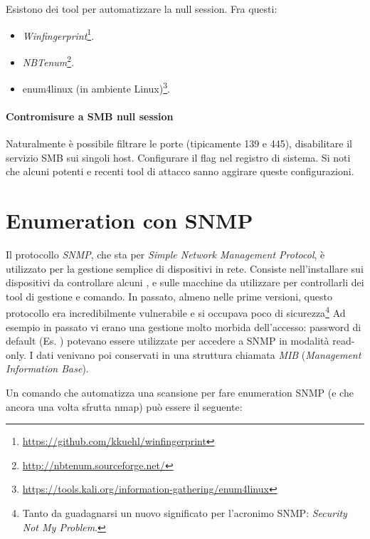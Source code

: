 \documentclass[14pt]{extreport}
\begin{document}
Esistono dei tool per automatizzare la null session. Fra questi:

\begin{itemize}
    \item \textit{Winfingerprint}\footnote{\url{https://github.com/kkuehl/winfingerprint}}.
    
    
    \item \textit{NBTenum}\footnote{\url{http://nbtenum.sourceforge.net/}}.
    
    
    \item enum4linux (in ambiente Linux)\footnote{\url{https://tools.kali.org/information-gathering/enum4linux}}.
\end{itemize}



\paragraph{Contromisure a SMB null session}

Naturalmente è possibile filtrare le porte (tipicamente 139 e 445), disabilitare il servizio SMB sui singoli host. Configurare il flag  nel registro di sistema. Si noti che alcuni potenti e recenti tool di attacco sanno aggirare queste configurazioni.





\section{Enumeration con SNMP}

Il protocollo \textit{SNMP}, che sta per \textit{Simple Network Management Protocol}, è utilizzato per la gestione semplice di dispositivi in rete. Consiste nell'installare sui dispositivi da controllare alcuni , e sulle macchine da utilizzare per controllarli dei tool di gestione e comando.\newline
In passato, almeno nelle prime versioni, questo protocollo era incredibilmente vulnerabile e si occupava poco di sicurezza\footnote{Tanto da guadagnarsi un nuovo significato per l'acronimo SNMP: \textit{Security Not My Problem}.}
Ad esempio in passato vi erano una gestione molto morbida dell'accesso: password di default (Es. ) potevano essere utilizzate per accedere a SNMP in modalità read-only. I dati venivano poi conservati in una struttura chiamata \textit{MIB} (\textit{Management Information Base}). 


Un comando che automatizza una scansione per fare enumeration SNMP (e che ancora una volta sfrutta nmap) può essere il seguente:
\end{document}
